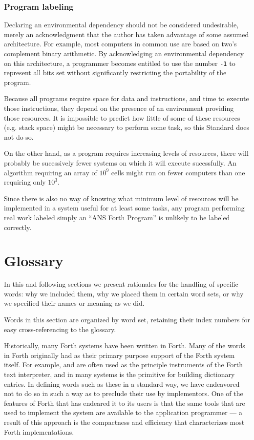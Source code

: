 \subsubsection{Program labeling} %

Declaring an environmental dependency should not be considered
undesirable, merely an acknowledgment that the author has taken
advantage of some assumed architecture. For example, most computers
in common use are based on two's complement binary arithmetic. By
acknowledging an environmental dependency on this architecture,
a programmer becomes entitled to use the number \texttt{-1} to
represent all bits set without significantly restricting the
portability of the program.

Because all programs require space for data and instructions, and
time to execute those instructions, they depend on the presence of
an environment providing those resources. It is impossible to predict
how little of some of these resources (e.g. stack space) might be
necessary to perform some task, so this Standard does not do so.

On the other hand, as a program requires increasing levels of
resources, there will probably be sucessively fewer systems on
which it will execute sucessfully. An algorithm requiring an array
of $10^9$ cells might run on fewer computers than one requiring
only $10^3$.

Since there is also no way of knowing what minimum level of resources
will be implemented in a system useful for at least some tasks, any
program performing real work labeled simply an ``ANS Forth Program''
is unlikely to be labeled correctly.


\section{Glossary} %

In this and following sections we present rationales for the handling
of specific words: why we included them, why we placed them in certain
word sets, or why we specified their names or meaning as we did.

Words in this section are organized by word set, retaining their index
numbers for easy cross-referencing to the glossary.

Historically, many Forth systems have been written in Forth. Many of
the words in Forth originally had as their primary purpose support of
the Forth system itself. For example,  and  are
often used as the principle instruments of the Forth text interpreter,
and  in many systems is the primitive for building
dictionary entries. In defining words such as these in a standard way,
we have endeavored not to do so in such a way as to preclude their use
by implementors. One of the features of Forth that has endeared it to
its users is that the same tools that are used to implement the system
are available to the application programmer --- a result of this
approach is the compactness and efficiency that characterizes most
Forth implementations.

